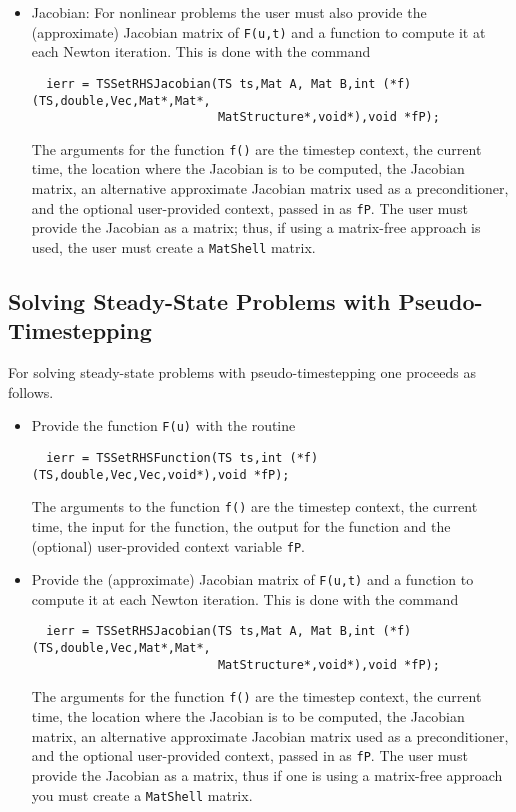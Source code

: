 \begin{itemize}
\item Jacobian: For nonlinear problems the user must also provide the 
(approximate) Jacobian matrix of {\tt F(u,t)} and a function to
compute it at each Newton iteration. This is done with the command
\begin{verbatim}
  ierr = TSSetRHSJacobian(TS ts,Mat A, Mat B,int (*f)(TS,double,Vec,Mat*,Mat*,
                          MatStructure*,void*),void *fP);
\end{verbatim}
The  arguments for the function {\tt f()} are
the timestep context, the current time, the location where the
Jacobian is to be computed, the Jacobian matrix, an alternative
approximate Jacobian matrix used as a preconditioner, and the optional
user-provided context, passed in as {\tt fP}. The user must provide the 
Jacobian as a matrix; thus, if using a matrix-free approach is used, the
user must create a {\tt MatShell} matrix.
\end{itemize}

\subsection{Solving Steady-State Problems with Pseudo-Timestepping}
For solving steady-state problems with pseudo-timestepping one proceeds 
as follows.
\begin{itemize}
\item Provide the function {\tt F(u)} with the routine
\begin{verbatim}
  ierr = TSSetRHSFunction(TS ts,int (*f)(TS,double,Vec,Vec,void*),void *fP);
\end{verbatim}
The  arguments to the function {\tt f()} are
the timestep context, the current time, the input for the function,
the output for the function and the (optional) user-provided context
variable {\tt fP}.

\item Provide the (approximate) Jacobian matrix of {\tt F(u,t)} and a 
function to compute it at each Newton iteration. This is done with the command
\begin{verbatim}
  ierr = TSSetRHSJacobian(TS ts,Mat A, Mat B,int (*f)(TS,double,Vec,Mat*,Mat*,
                          MatStructure*,void*),void *fP);
\end{verbatim}
The  arguments for the function {\tt f()} are
the timestep context, the current time, the location where the
Jacobian is to be computed, the Jacobian matrix, an alternative
approximate Jacobian matrix used as a preconditioner, and the optional
user-provided context, passed in as {\tt fP}. The user must provide the 
Jacobian as a matrix, thus if one is using a matrix-free approach you 
must create a {\tt MatShell} matrix.
\end{itemize}


